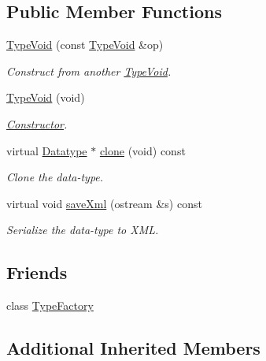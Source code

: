 \subsection*{Public Member Functions}
\begin{DoxyCompactItemize}
\item 
\mbox{\hyperlink{class_type_void_a0f216f73b958ec183bed20890377159c}{Type\+Void}} (const \mbox{\hyperlink{class_type_void}{Type\+Void}} \&op)
\begin{DoxyCompactList}\small\item\em Construct from another \mbox{\hyperlink{class_type_void}{Type\+Void}}. \end{DoxyCompactList}\item 
\mbox{\hyperlink{class_type_void_af09fbc39a21e0a7b9fcedfed715c9592}{Type\+Void}} (void)
\begin{DoxyCompactList}\small\item\em \mbox{\hyperlink{class_constructor}{Constructor}}. \end{DoxyCompactList}\item 
virtual \mbox{\hyperlink{class_datatype}{Datatype}} $\ast$ \mbox{\hyperlink{class_type_void_a4fe8a82cb4657566119e63b73164d22a}{clone}} (void) const
\begin{DoxyCompactList}\small\item\em Clone the data-\/type. \end{DoxyCompactList}\item 
virtual void \mbox{\hyperlink{class_type_void_a4c29213947ce96b7899e5c8102ec54dc}{save\+Xml}} (ostream \&s) const
\begin{DoxyCompactList}\small\item\em Serialize the data-\/type to X\+ML. \end{DoxyCompactList}\end{DoxyCompactItemize}
\subsection*{Friends}
\begin{DoxyCompactItemize}
\item 
class \mbox{\hyperlink{class_type_void_ac8c1945d0a63785e78b3e09a13226ed6}{Type\+Factory}}
\end{DoxyCompactItemize}
\subsection*{Additional Inherited Members}


